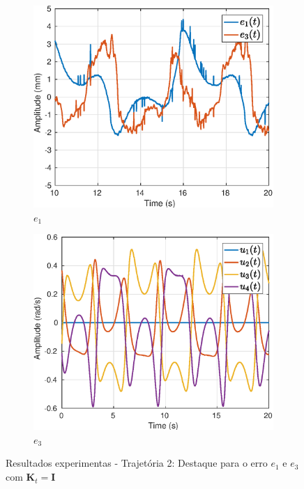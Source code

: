 \begin{figure}[H]
\centering
\begin{subfigure}{.5\textwidth}
  \centering
  \includegraphics[width=\linewidth]{./img/traj_2_k1/error.eps}
  \caption{$e_1$}
  \label{fig:sub1}
\end{subfigure}%
\begin{subfigure}{.5\textwidth}
  \centering
  \includegraphics[width=\linewidth]{./img/traj_2_k1/u.eps}
  \caption{$e_3$}
  \label{fig:sub2}
\end{subfigure}
\caption{Resultados experimentas - Trajetória 2: Destaque para o erro $e_1$ e $e_3$ com $\bm{K}_t = \bm{I}$}
\label{fig:erro_traj}
\end{figure}

